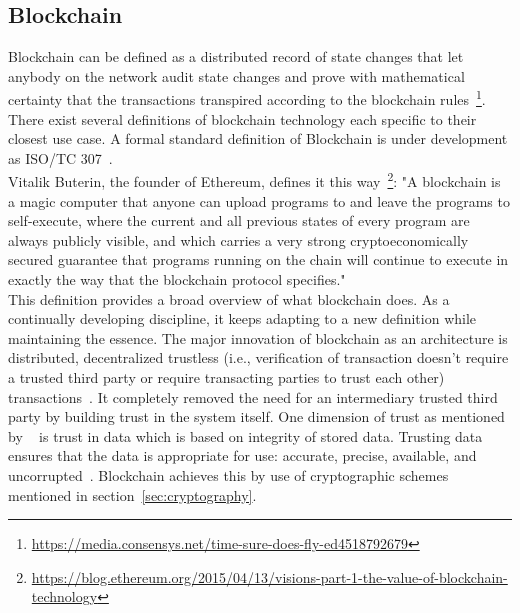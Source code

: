 \subsection{Blockchain}
Blockchain can be defined as a distributed record of state changes that let
anybody on the network audit state changes and prove with mathematical
certainty that the transactions transpired according to the blockchain
rules~\footnote{\url{https://media.consensys.net/time-sure-does-fly-ed4518792679}}.
There exist several definitions of blockchain technology each specific to their
closest use case. A formal standard definition of Blockchain is under
development as ISO/TC 307~\cite{ISOTC307}.\\
Vitalik Buterin, the founder of Ethereum, defines it this
way~\footnote{\url{https://blog.ethereum.org/2015/04/13/visions-part-1-the-value-of-blockchain-technology}}: "A blockchain is a magic computer that anyone can upload programs to and leave
the programs to self-execute, where the current and all previous states of
every program are always publicly visible, and which carries a very strong
cryptoeconomically secured guarantee that programs running on the chain will
continue to execute in exactly the way that the blockchain protocol
specifies."\\
This definition provides a broad overview of what blockchain does. As a
continually developing discipline, it keeps adapting to a new definition while
maintaining the essence. The major innovation of blockchain as an architecture
is distributed, decentralized trustless (i.e., verification of transaction
doesn't require a trusted third party or require transacting parties to trust
each other) transactions~\cite{Bitcoin_Satoshi}. It completely removed the need
for an intermediary trusted third party by building trust in the system itself.
One dimension of trust as mentioned by ~\cite{miller2010trust} is trust in data
which is based on integrity of stored data.  Trusting data ensures that the
data is appropriate for use: accurate, precise, available, and
uncorrupted~\cite{miller2010trust}.  Blockchain achieves this by use of
cryptographic schemes mentioned in section~\ref{sec:cryptography}.
\newpage

